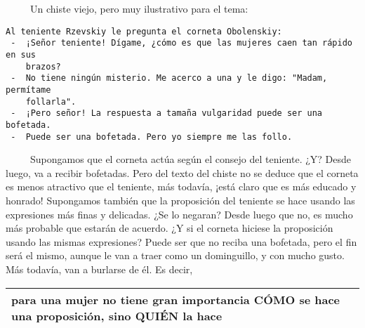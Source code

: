 ~ ~ ~ Un chiste viejo, pero muy ilustrativo para el tema:

\begin{verbatim}
Al teniente Rzevskiy le pregunta el corneta Obolenskiy:
 -  ¡Señor teniente! Dígame, ¿cómo es que las mujeres caen tan rápido en sus
    brazos?
 -  No tiene ningún misterio. Me acerco a una y le digo: "Madam, permítame
    follarla".
 -  ¡Pero señor! La respuesta a tamaña vulgaridad puede ser una bofetada.
 -  Puede ser una bofetada. Pero yo siempre me las follo.
\end{verbatim}

~ ~ ~ Supongamos que el corneta actúa según el consejo del teniente. ¿Y?
Desde luego, va a recibir bofetadas. Pero del texto del chiste no se
deduce que el corneta es menos atractivo que el teniente, más todavía,
¡está claro que es más educado y honrado! Supongamos también que la
proposición del teniente se hace usando las expresiones más finas y
delicadas. ¿Se lo negaran? Desde luego que no, es mucho más probable que
estarán de acuerdo. ¿Y si el corneta hiciese la proposición usando las
mismas expresiones? Puede ser que no reciba una bofetada, pero el fin
será el mismo, aunque le van a traer como un dominguillo, y con mucho
gusto. Más todavía, van a burlarse de él. Es decir,

\begin{longtable}[]{@{}l@{}}
\toprule
para una mujer no tiene gran importancia CÓMO se hace una proposición,
sino QUIÉN la hace\tabularnewline
\bottomrule
\end{longtable}

